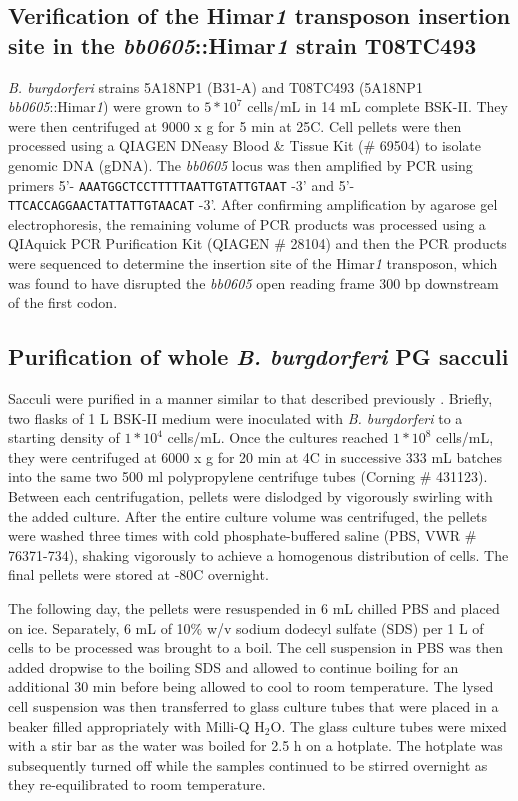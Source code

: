 \documentclass[twoside, watermark]{zHenriquesLab-StyleBioRxiv}
\newcommand{\HtwoO}{H$_\text{2}$O} %
\begin{document}
\subsection*{Verification of the Himar\textit{1} transposon insertion site in the \textit{bb0605}::Himar\textit{1} strain T08TC493}
\textit{B. burgdorferi} strains 5A18NP1 (B31-A) and T08TC493 (5A18NP1 \textit{bb0605}::Himar\textit{1}) were grown to $5 * 10^7$ cells/mL in 14 mL complete BSK-II. They were then centrifuged at 9000 x g for 5 min at 25\degree C. Cell pellets were then processed using a QIAGEN DNeasy Blood \& Tissue Kit (\# 69504) to isolate genomic DNA (gDNA). The \textit{bb0605} locus was then amplified by PCR using primers 5’- \texttt{AAATGGCTCCTTTTTAATTGTATTGTAAT} -3’ and 5’- \texttt{TTCACCAGGAACTATTATTGTAACAT} -3’. After confirming amplification by agarose gel electrophoresis, the remaining volume of PCR products was processed using a QIAquick PCR Purification Kit (QIAGEN \# 28104) and then the PCR products were sequenced to determine the insertion site of the Himar\textit{1} transposon, which was found to have disrupted the \textit{bb0605} open reading frame 300 bp downstream of the first codon.

\subsection*{Purification of whole \textit{B. burgdorferi} PG sacculi}
Sacculi were purified in a manner similar to that described previously \cite{Alvarez2016}. Briefly, two flasks of 1 L BSK-II medium were inoculated with \textit{B. burgdorferi} to a starting density of $1 * 10^4$ cells/mL. Once the cultures reached $1 * 10^8$ cells/mL, they were centrifuged at 6000 x g for 20 min at 4\degree C in successive 333 mL batches into the same two 500 ml polypropylene centrifuge tubes (Corning \# 431123). Between each centrifugation, pellets were dislodged by vigorously swirling with the added culture. After the entire culture volume was centrifuged, the pellets were washed three times with cold phosphate-buffered saline (PBS, VWR \# 76371-734), shaking vigorously to achieve a homogenous distribution of cells. The final pellets were stored at -80\degree C overnight. 

\vspace{1mm}
The following day, the pellets were resuspended in 6 mL chilled PBS and placed on ice. Separately, 6 mL of 10\% w/v sodium dodecyl sulfate (SDS) per 1 L of cells to be processed was brought to a boil. The cell suspension in PBS was then added dropwise to the boiling SDS and allowed to continue boiling for an additional 30 min before being allowed to cool to room temperature. The lysed cell suspension was then transferred to glass culture tubes that were placed in a beaker filled appropriately with Milli-Q \HtwoO. The glass culture tubes were mixed with a stir bar as the water was boiled for 2.5 h on a hotplate. The hotplate was subsequently turned off while the samples continued to be stirred overnight as they re-equilibrated to room temperature.
\end{document}
